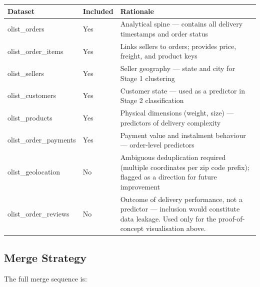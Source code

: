 \documentclass[
]{article}
\begin{document}
\begin{longtable}[]{@{}
  >{\raggedright\arraybackslash}p{}
  >{\raggedright\arraybackslash}p{}
  >{\raggedright\arraybackslash}p{}@{}}
\toprule\noalign{}
\begin{minipage}[b]{\linewidth}\raggedright
Dataset
\end{minipage} & \begin{minipage}[b]{\linewidth}\raggedright
Included
\end{minipage} & \begin{minipage}[b]{\linewidth}\raggedright
Rationale
\end{minipage} \\
\midrule\noalign{}
\endhead
\bottomrule\noalign{}
\endlastfoot
olist\_orders & Yes & Analytical spine --- contains all delivery
timestamps and order status \\
olist\_order\_items & Yes & Links sellers to orders; provides price,
freight, and product keys \\
olist\_sellers & Yes & Seller geography --- state and city for Stage 1
clustering \\
olist\_customers & Yes & Customer state --- used as a predictor in Stage
2 classification \\
olist\_products & Yes & Physical dimensions (weight, size) ---
predictors of delivery complexity \\
olist\_order\_payments & Yes & Payment value and instalment behaviour
--- order-level predictors \\
olist\_geolocation & No & Ambiguous deduplication required (multiple
coordinates per zip code prefix); flagged as a direction for future
improvement \\
olist\_order\_reviews & No & Outcome of delivery performance, not a
predictor --- inclusion would constitute data leakage. Used only for the
proof-of-concept visualisation above. \\
\end{longtable}

\subsection{Merge Strategy}\label{merge-strategy}

The full merge sequence is:
\end{document}
